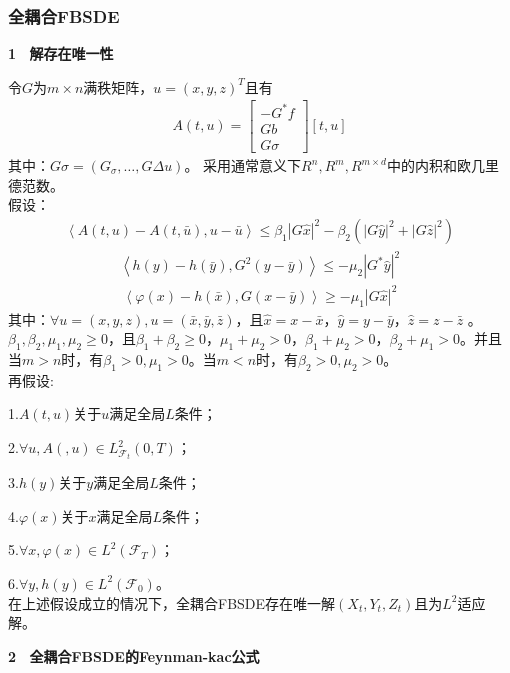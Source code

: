 		\subsubsection{全耦合FBSDE}
			\par
			\textbf{1 \ 解存在唯一性}
			\par
			令$G$为$m \times n$满秩矩阵，$u=(x,y,z)^T$且有
			\begin{align*}
			A\left( {t,u} \right) = \left[ {\begin{array}{*{20}{c}}
			{ - {G^*}f}\\
			{Gb}\\
			{G\sigma }
			\end{array}} \right]\left[ {t,u} \right]\end{align*}
			其中：$G\sigma=(G_\sigma,\ldots,G{\Delta u})$。
			采用通常意义下$R^n,R^m,R^{m \times d}$中的内积和欧几里德范数。\\
			假设：
			\begin{align*}
			\left\langle {A\left( {t,u} \right) - A\left( {t,\bar u} \right),u - \bar u} \right\rangle  \leqslant {\beta _1}{\left| {G\hat x} \right|^2} - {\beta _2}\left( {{{\left| {G\hat y} \right|}^2} + {{\left| {G\hat z} \right|}^2}} \right)
			\end{align*}
			\begin{align*}
			\left\langle {h\left( y \right) - h\left( {\bar y} \right),{G^2}\left( {y - \bar y} \right)} \right\rangle  \leqslant  - {\mu _2}{\left| {{G^*}\hat y} \right|^2}\end{align*}
			\begin{align*}
			\left\langle {\varphi \left( x \right) - h\left( {\bar x} \right),G\left( {x - \bar y} \right)} \right\rangle  \geqslant  - {\mu _1}{\left| {G\hat x} \right|^2}\end{align*}
			其中：$\forall u = \left( {x,y,z} \right),u = \left( {\bar x,\bar y,\bar z} \right)$，且$\hat x = x - \bar x$，$\hat y =y - \bar y$，$\hat z = z - \bar z$ 。
			$\beta_1,\beta_2,\mu_1,\mu_2 \geqslant 0$，且$\beta_1+\beta_2 \geqslant 0$，$\mu_1+\mu_2>0$，$\beta_1+\mu_2>0$，$\beta_2+\mu_1>0$。并且当$m>n$时，有$\beta_1>0,\mu_1>0 $。当$m<n$时，有$\beta_2>0,\mu_2>0$。\\
			再假设:
				\par
				1.$A\left( {t,u} \right)$关于$u$满足全局$L$条件；
				\par
				2.$\forall u,A\left( {,u} \right) \in L_{{{\mathcal {F}}_t}}^2\left( {0,T} \right)$；
				\par
				3.$h(y)$关于$y$满足全局$L$条件；
				\par
				4.$\varphi(x)$关于$x$满足全局$L$条件；
				\par
				5.$\forall x,\varphi(x) \in L^2({{\mathcal {F}}_T})$；
				\par
				6.$\forall y,h(y) \in L^2({{\mathcal {F}}_0})$。\\
			在上述假设成立的情况下，全耦合FBSDE存在唯一解$(X_t,Y_t,Z_t)$且为$L^2$适应解。
			\par
			\textbf{2 \ 全耦合FBSDE的Feynman-kac公式\cite{2007.Gobet}}

